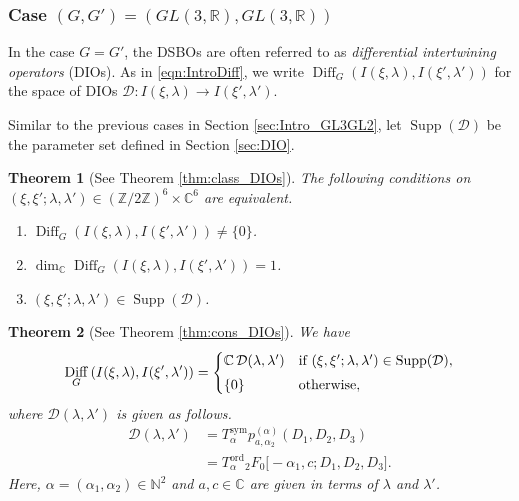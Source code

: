 \documentclass[a4paper,11pt,reqno]{amsart}
\newcommand{\CC}{\mathbb{C}}
\newcommand{\NN}{\mathbb{N}}
\newcommand{\calD}{\mathcal{D}}
\newcommand{\0}{{\bf 0}}
\newcommand{\Z}{\mathbb{Z}}
\newcommand{\R}{\mathbb{R}}
\newcommand{\C}{\mathbb{C}}
\newcommand{\1}{{\bf 1}}
\newcommand{\ord}{{\mathrm{ord}}}
\DeclareMathOperator{\Supp}{Supp}
\DeclareMathOperator{\Diff}{Diff}
\theoremstyle{plain}
\newtheorem{thmalph}{Theorem}
\theoremstyle{definition}
\numberwithin{equation}{section}
\theoremstyle{definition}
\begin{document}
\subsubsection{Case \texorpdfstring{$(G,G')=(GL(3,\R), GL(3,\R))$}{(G,G')=(GL(3,R),GL(2,R))}}

In the case $G=G'$, the DSBOs are often referred to as 
\emph{differential intertwining operators} (DIOs).
As in \eqref{eqn:IntroDiff}, we write 
$\Diff_{G}\left(I(\xi, \lambda), I(\xi', \lambda')\right)$
for the space of DIOs $\calD \colon  I(\xi, \lambda) \to I(\xi', \lambda')$.

Similar to the previous cases in Section \ref{sec:Intro_GL3GL2}, 
let $\Supp(\calD)$ be the parameter set defined in Section \ref{sec:DIO}.


\begin{thmalph}[See Theorem \ref{thm:class_DIOs}]
\label{Intro:F}
The following conditions on  $(\xi, \xi'; \lambda, \lambda') \in (\Z/2\Z)^6 \times \C^6$ are equivalent.
\begin{enumerate}[label = \normalfont{(\roman*)}]
    \item $\Diff_{G}\left(I(\xi, \lambda), I(\xi', \lambda')\right) \neq \{0\}$.
    
    \item $\dim_\C \Diff_{G}\left(I(\xi, \lambda), I(\xi', \lambda')\right) = 1$.

    \item $(\xi, \xi'; \lambda, \lambda') \in \Supp(\calD)$.
\end{enumerate}
\end{thmalph}

\begin{thmalph}[See Theorem \ref{thm:cons_DIOs}]
\label{Intro:G}
We have
\begin{equation*}
\Diff_{G}\left(I(\xi, \lambda), I(\xi', \lambda')\right)
=
\begin{cases}
\CC\, \calD(\lambda, \lambda') & 
\textnormal{if $(\xi, \xi'; \lambda, \lambda') \in \Supp(\calD)$},\\[3pt]
\{0\} & \textnormal{otherwise},
\end{cases}
\end{equation*}
where $\calD(\lambda, \lambda')$ 
is given as follows.
\begin{align*}
\calD(\lambda,\lambda')
&=T^{\mathrm{sym}}_{\alpha}
p_{a,\alpha_2}^{(\alpha)}
(D_1, D_2, D_3)\\[3pt]
&=T^\ord_{\alpha}
{}_2F_0\Big [-\alpha_1, c; D_1, D_2, D_3\Big ].
\end{align*}
Here, $\alpha=(\alpha_1,\alpha_2)\in \NN^2$ and $a,c\in \CC$ are given in terms of $\lambda$ and $\lambda'$.
\end{thmalph}
\end{document}
